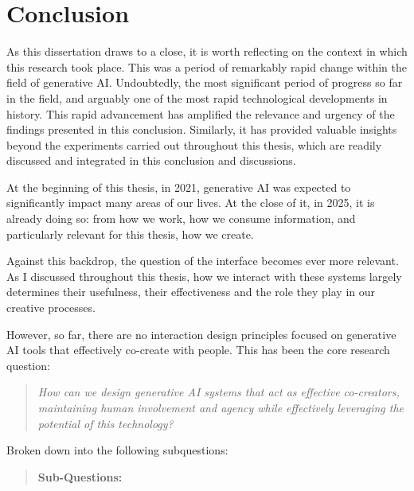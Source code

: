 \chapter[Conclusion]{Conclusion}\label{c:conclusion}

As this dissertation draws to a close, it is worth reflecting on the context in which this research took place. This was a period of remarkably rapid change within the field of generative AI. Undoubtedly, the most significant period of progress so far in the field, and arguably one of the most rapid technological developments in history. This rapid advancement has amplified the relevance and urgency of the findings presented in this conclusion. Similarly, it has provided valuable insights beyond the experiments carried out throughout this thesis, which are readily discussed and integrated in this conclusion and discussions. 

At the beginning of this thesis, in 2021, generative AI was expected to significantly impact many areas of our lives. At the close of it, in 2025, it is already doing so: from how we work, how we consume information, and particularly relevant for this thesis, how we create.

Against this backdrop, the question of the interface becomes ever more relevant. As I discussed throughout this thesis, how we interact with these systems largely determines their usefulness, their effectiveness and the role they play in our creative processes. 

However, so far, there are no interaction design principles focused on generative AI tools that effectively co-create with people. This has been the core research question: 

\begin{quote}
\emph{How can we design generative AI systems that act as effective co-creators, maintaining human involvement and agency while effectively leveraging the potential of this technology?}
\end{quote}

Broken down into the following subquestions: 

\begin{quote}
\textbf{Sub-Questions:}
\end{quote}

